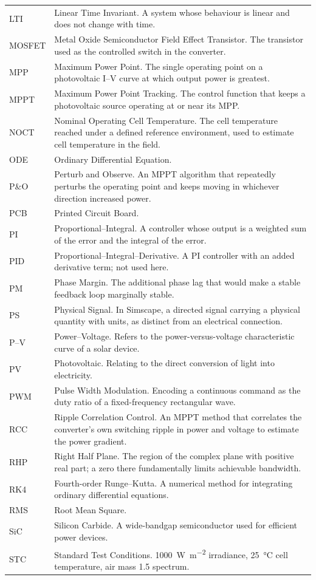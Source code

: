 \begin{longtable}{@{}L{0.16\textwidth}L{0.80\textwidth}@{}}
LTI & Linear Time Invariant. A system whose behaviour is linear and does not change with time. \\
MOSFET & Metal Oxide Semiconductor Field Effect Transistor. The transistor used as the controlled switch in the converter. \\
MPP & Maximum Power Point. The single operating point on a photovoltaic I--V curve at which output power is greatest. \\
MPPT & Maximum Power Point Tracking. The control function that keeps a photovoltaic source operating at or near its MPP. \\
NOCT & Nominal Operating Cell Temperature. The cell temperature reached under a defined reference environment, used to estimate cell temperature in the field. \\
ODE & Ordinary Differential Equation. \\
P\&O & Perturb and Observe. An MPPT algorithm that repeatedly perturbs the operating point and keeps moving in whichever direction increased power. \\
PCB & Printed Circuit Board. \\
PI & Proportional--Integral. A controller whose output is a weighted sum of the error and the integral of the error. \\
PID & Proportional--Integral--Derivative. A PI controller with an added derivative term; not used here. \\
PM & Phase Margin. The additional phase lag that would make a stable feedback loop marginally stable. \\
PS & Physical Signal. In Simscape, a directed signal carrying a physical quantity with units, as distinct from an electrical connection. \\
P--V & Power--Voltage. Refers to the power-versus-voltage characteristic curve of a solar device. \\
PV & Photovoltaic. Relating to the direct conversion of light into electricity. \\
PWM & Pulse Width Modulation. Encoding a continuous command as the duty ratio of a fixed-frequency rectangular wave. \\
RCC & Ripple Correlation Control. An MPPT method that correlates the converter's own switching ripple in power and voltage to estimate the power gradient. \\
RHP & Right Half Plane. The region of the complex plane with positive real part; a zero there fundamentally limits achievable bandwidth. \\
RK4 & Fourth-order Runge--Kutta. A numerical method for integrating ordinary differential equations. \\
RMS & Root Mean Square. \\
SiC & Silicon Carbide. A wide-bandgap semiconductor used for efficient power devices. \\
STC & Standard Test Conditions. \SI{1000}{\watt\per\square\metre} irradiance, \SI{25}{\celsius} cell temperature, air mass 1.5 spectrum. \\
\bottomrule
\end{longtable}

